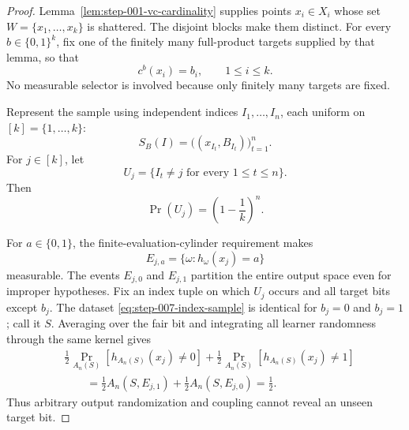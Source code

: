 \begin{proof}
Lemma~\ref{lem:step-001-vc-cardinality} supplies points \(x_i\in X_i\)
whose set \(W=\{x_1,\ldots,x_k\}\) is shattered.  The disjoint blocks make
them distinct.  For every \(b\in\{0,1\}^k\), fix one of the finitely many
full-product targets supplied by that lemma, so that
\begin{equation}\label{eq:step-007-target-labels}
c^b(x_i)=b_i,\qquad1\le i\le k.
\end{equation}
No measurable selector is involved because only finitely many targets are
fixed.

Represent the sample using independent indices
\(I_1,\ldots,I_n\), each uniform on \([k]=\{1,\ldots,k\}\):
\begin{equation}\label{eq:step-007-index-sample}
S_B(I)=\bigl((x_{I_t},B_{I_t})\bigr)_{t=1}^n.
\end{equation}
For \(j\in[k]\), let
\begin{equation}\label{eq:step-007-unseen-event}
U_j=\{I_t\ne j\text{ for every }1\le t\le n\}.
\end{equation}
Then
\begin{equation}\label{eq:step-007-unseen-probability}
\Pr(U_j)=\left(1-\frac1k\right)^n.
\end{equation}

For \(a\in\{0,1\}\), the finite-evaluation-cylinder requirement makes
\begin{equation}\label{eq:step-007-evaluation-events}
E_{j,a}=\{\omega:h_\omega(x_j)=a\}
\end{equation}
measurable.  The events \(E_{j,0}\) and \(E_{j,1}\) partition the entire
output space even for improper hypotheses.  Fix an index tuple on which
\(U_j\) occurs and all target bits except \(b_j\).  The dataset
\eqref{eq:step-007-index-sample} is identical for \(b_j=0\) and \(b_j=1\);
call it \(S\).  Averaging over the fair bit and integrating all learner
randomness through the same kernel gives
\begin{equation}\label{eq:step-007-fair-unseen-bit}
\begin{split}
&\frac12\Pr_{A_n(S)}[h_{A_n(S)}(x_j)\ne0]
+\frac12\Pr_{A_n(S)}[h_{A_n(S)}(x_j)\ne1]\\
&\qquad=\frac12A_n(S,E_{j,1})+\frac12A_n(S,E_{j,0})
=\frac12.
\end{split}
\end{equation}
Thus arbitrary output randomization and coupling cannot reveal an unseen
target bit.


\end{proof}
